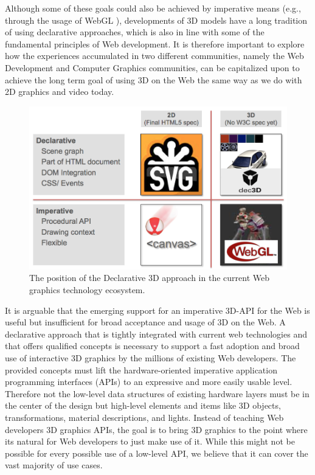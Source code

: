 \documentclass[review]{acmsiggraph}
\begin{document}
Although some of these goals could also be achieved by imperative means (e.g., through the usage of WebGL \cite{WebGL12}), developments of 3D models have a long tradition of using declarative approaches, which is also in line with some of the fundamental principles of Web development. It is therefore important to explore how the experiences accumulated in two different communities, namely the Web Development and Computer Graphics communities, can be capitalized upon to achieve the long term goal of using 3D on the Web the same way as we do with 2D graphics and video today.

\begin{figure}%
  \centering
  \includegraphics[width=\linewidth]{images/Declarative3d.png}
  \caption{The position of the Declarative 3D approach in the current Web graphics technology ecosystem.}
  \label{fig:DeclarativeVsImperative}
\end{figure}

It is arguable that the emerging support for an imperative 3D-API for the Web is useful but insufficient for broad acceptance and usage of 3D on the Web. A declarative approach that is tightly integrated with current web technologies and that offers qualified concepts is necessary to support a fast adoption and broad use of interactive 3D graphics by the millions of existing Web developers. The provided concepts must lift the hardware-oriented imperative application programming interfaces (APIs) to an expressive and more easily usable level. Therefore not the low-level data structures of existing hardware layers must be in the center of the design but high-level elements and items like 3D objects, transformations, material descriptions, and lights. Instead of teaching Web developers 3D graphics APIs, the goal is to bring 3D graphics to the point where its natural for Web developers to just make use of it. While this might not be possible for every possible use of a low-level API, we believe that it can cover the vast majority of use cases.
\end{document}
